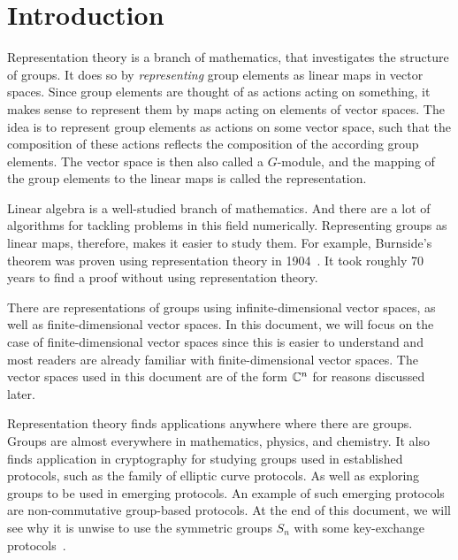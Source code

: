 \section{Introduction}

Representation theory is a branch of mathematics, that investigates the structure of groups.
It does so by \textit{representing} group elements as linear maps in vector spaces.
Since group elements are thought of as actions acting on something, it makes sense to represent them by maps acting on elements of vector spaces.
The idea is to represent group elements as actions on some vector space, such that the composition of these actions reflects the composition of the according group elements.
The vector space is then also called a $G$-module, and the mapping of the group elements to the linear maps is called the representation.

Linear algebra is a well-studied branch of mathematics.
And there are a lot of algorithms for tackling problems in this field numerically.
Representing groups as linear maps, therefore, makes it easier to study them.
For example, Burnside's theorem was proven using representation theory in 1904~\cite{burnside1904groups}.
It took roughly 70 years to find a proof without using representation theory.

There are representations of groups using infinite-dimensional vector spaces, as well as finite-dimensional vector spaces.
In this document, we will focus on the case of finite-dimensional vector spaces since this is easier to understand and most readers are already familiar with finite-dimensional vector spaces.
The vector spaces used in this document are of the form $\mathbb{C}^n$ for reasons discussed later.

Representation theory finds applications anywhere where there are groups.
Groups are almost everywhere in mathematics, physics, and chemistry.
It also finds application in cryptography for studying groups used in established protocols, such as the family of elliptic curve protocols.
As well as exploring groups to be used in emerging protocols.
An example of such emerging protocols are non-commutative group-based protocols.
At the end of this document, we will see why it is unwise to use the symmetric groups $S_n$ with some key-exchange protocols~\cite{khovanov2022monoidal}.
